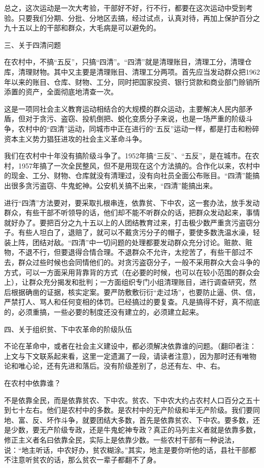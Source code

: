 总之，这次运动是一次大考验，干部好不好，行不行，都要在这次运动中受到考验。只要我们分期、分批、分地区去搞，经过试点，认真对待，再加上保护百分之九十五以上的干部和群众，大毛病是可以避免的。

三、关于四清问题

在农村中，不搞“五反”，只搞“四清”。“四清”就是清理账目，清理工分，清理仓库，清理财物。其中又主要是清理账目、清理工分两项。首先应当发动群众把1962年以来的账目、仓库、财物、工分，同时把国家投资、银行贷款和商业部门赊销所添置的资产，全面彻底地清查一次。

这是一项同社会主义教育运动相结合的大规模的群众运动，主要解决人民内部矛盾，但对于贪污、盗窃、投机倒把、蜕化变质分子来说，也是一场严重的阶级斗争，农村中的“四清”运动，同城市中正在进行的“五反”运动一样，都是打击和粉碎资本主义势力猖狂进攻的社会主义革命斗争。

我们在农村中十年没有搞阶级斗争了。1952年搞“三反”、“五反”，是在城市。在农村，1957年搞了一次全民整风，但不是用现在这个方法搞的。合作化以来，农村中的现金、工分、财物、仓库就没有清理过，没有向社员全面公布账目。“四清”能搞出很多贪污盗窃、牛鬼蛇神。公安机关搞不出来，“四清”能搞出来。

进行“四清”方法要对，要采取扎根串连，依靠贫、下中农，这一套办法，放手发动群众，有些干部不听领导的话，他们却不能不听群众的话，把群众发动起来，事情就好办了。要把百分之九十五以上的人团结教育过来，打击极少数严重贪污盗窃分子。有些人坦白了，退赔了，就可以不戴贪污分子的帽子，要使多数洗温水澡，轻装上阵，团结对敌。“四清”中一切问题的处理都要发动群众充分讨论。赃款、赃物，不退不行，但要退得合情合理。不退群众不允许，太挖苦了，有些干部过不去，群众过些时候也会同情他们的。对贪污盗窃分子，一般不采用群众大会斗争的方式，可以一方面采用背靠背的方式（在必要的时候，也可以在较小范围的群众会上），让群众充分揭发和批判；一方面组织专门小组清理账目，进行调查研究，然后根据确凿的证据，核实定案。要严防敷敷衍衍“走过场”，也要防止逼、供、信，严禁打人、骂人和任何变相的体罚。已经搞过的要复查。凡是搞得不好，真不彻底的，必须重搞，一些必要的制度还没有建立的，必须建立起来。

四、关于组织贫、下中农革命的阶级队伍

不论在革命中，或者在社会主义建设中，都必须解决依靠谁的问题。（翻印者注：上文与下文联系起来看，这里一定遗漏了一段，请读者注意），因为那时还有唯物论和唯心论，还有先进和落后。没有阶级差别了，总还有左、中、右。

在农村中依靠谁？

不是依靠全民，而是依靠贫农、下中农。贫农、下中农大约占农村人口百分之五十到七十左右。他们是农村中的多数。是农村中的无产阶级和半无产阶级。我们要同地、富、反、坏作斗争，就要团结大多数，首先是依靠贫农、下中农。要多数，还是少数，要无产阶级专政，还是牛鬼蛇神专政？真正的马列主义者就是依靠多数，修正主义者名曰依靠全民，实际上是依靠少数。一些农村干部有一种说法，说：“地主听话，中农好办，贫农糊涂。”其实，地主是要你听他的话，县社干部都不注意听贫农的话，那么贫农一辈子都翻不了身。


